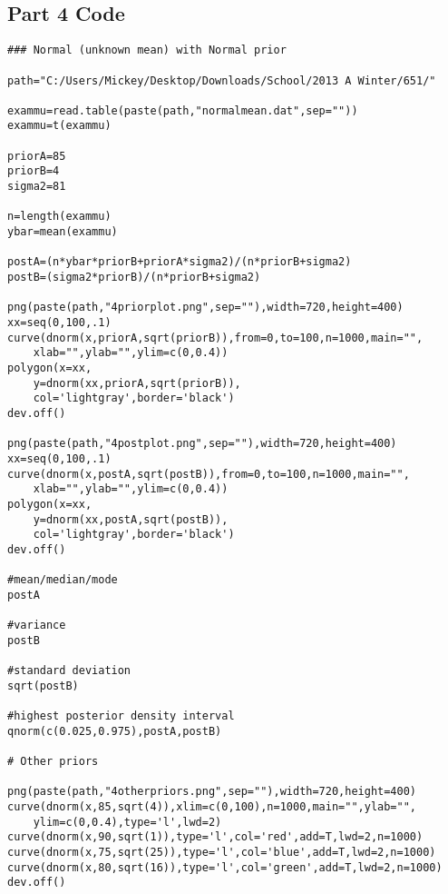 \documentclass[12pt]{article}
\begin{document}
\subsection*{Part 4 Code}
\begin{scriptsize}
\begin{verbatim}
### Normal (unknown mean) with Normal prior

path="C:/Users/Mickey/Desktop/Downloads/School/2013 A Winter/651/"

exammu=read.table(paste(path,"normalmean.dat",sep=""))
exammu=t(exammu)

priorA=85
priorB=4
sigma2=81

n=length(exammu)
ybar=mean(exammu)

postA=(n*ybar*priorB+priorA*sigma2)/(n*priorB+sigma2)
postB=(sigma2*priorB)/(n*priorB+sigma2)

png(paste(path,"4priorplot.png",sep=""),width=720,height=400)
xx=seq(0,100,.1)
curve(dnorm(x,priorA,sqrt(priorB)),from=0,to=100,n=1000,main="",
    xlab="",ylab="",ylim=c(0,0.4))
polygon(x=xx,
    y=dnorm(xx,priorA,sqrt(priorB)),
    col='lightgray',border='black')
dev.off()

png(paste(path,"4postplot.png",sep=""),width=720,height=400)
xx=seq(0,100,.1)
curve(dnorm(x,postA,sqrt(postB)),from=0,to=100,n=1000,main="",
    xlab="",ylab="",ylim=c(0,0.4))
polygon(x=xx,
    y=dnorm(xx,postA,sqrt(postB)),
    col='lightgray',border='black')
dev.off()

#mean/median/mode
postA

#variance
postB

#standard deviation
sqrt(postB)

#highest posterior density interval
qnorm(c(0.025,0.975),postA,postB)

# Other priors

png(paste(path,"4otherpriors.png",sep=""),width=720,height=400)
curve(dnorm(x,85,sqrt(4)),xlim=c(0,100),n=1000,main="",ylab="",
    ylim=c(0,0.4),type='l',lwd=2)
curve(dnorm(x,90,sqrt(1)),type='l',col='red',add=T,lwd=2,n=1000)
curve(dnorm(x,75,sqrt(25)),type='l',col='blue',add=T,lwd=2,n=1000)
curve(dnorm(x,80,sqrt(16)),type='l',col='green',add=T,lwd=2,n=1000)
dev.off()
\end{verbatim}
\end{scriptsize}
\end{document}
